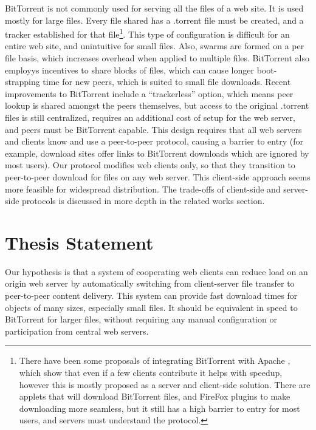 
BitTorrent is not commonly used for serving all the files of a web site.  It is used mostly for large files.  Every file shared has a .torrent file must be created, and a tracker established for that file\footnote{There have been some proposals of integrating BitTorrent with Apache \cite{webtorrent}, which show that even if a few clients contribute it helps with speedup, however this is mostly proposed as a server and client-side solution.  There are applets that will download BitTorrent files, and FireFox plugins to make downloading more seamless, but it still has a high barrier to entry for most users, and servers must understand the protocol.}.  This type of configuration is difficult for an entire web site, and unintuitive for small files.  Also, swarms are formed on a per file basis, which increases overhead when applied to multiple files.  BitTorrent also employys incentives to share blocks of files, which can cause longer boot-strapping time for new peers, which is suited to small file downloads.  Recent improvements to BitTorrent include a ``trackerless'' option, which means peer lookup is shared amongst the peers themselves, but access to the original .torrent files is still centralized, requires an additional cost of setup for the web server, and peers must be BitTorrent capable.  This design requires that all web servers and clients know and use a peer-to-peer protocol, causing a barrier to entry (for example, download sites offer links to BitTorrent downloads which are ignored by most users).  Our protocol modifies web clients only, so that they transition to peer-to-peer download for files on any web server.  This client-side approach seems more feasible for widespread distribution.  The trade-offs of client-side and server-side protocols is discussed in more depth in the related works section.

\section {Thesis Statement}\label{section:thesis}
Our hypothesis is that a system of cooperating web clients can reduce load on an origin web server by automatically switching from client-server file transfer to peer-to-peer content delivery.  This system can provide fast download times for objects of many sizes, especially small files.  It should be equivalent in speed to BitTorrent for larger files, without requiring any manual configuration or participation from central web servers.

